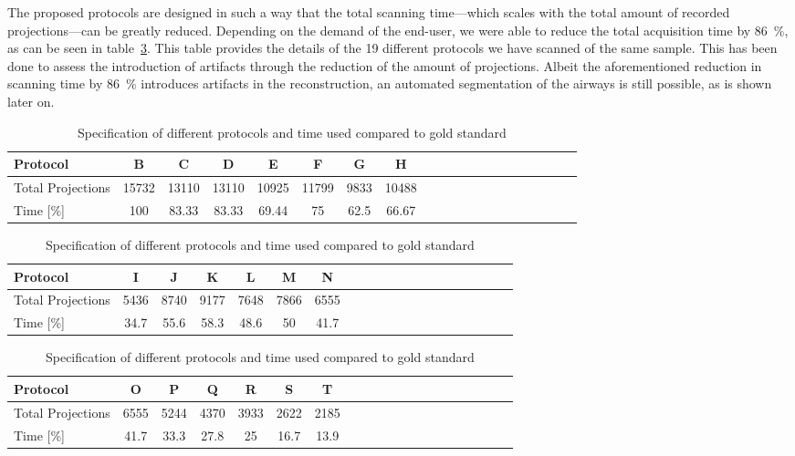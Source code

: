 The proposed protocols are designed in such a way that the total scanning time---which scales with the total amount of recorded projections---can be greatly reduced. Depending on the demand of the end-user, we were able to reduce the total acquisition time by \SI{86}{\percent}, as can be seen in table~\ref{tab:projections}. This table provides the details of the 19 different protocols we have scanned of the same sample. This has been done to assess the introduction of artifacts through the reduction of the amount of projections. Albeit the aforementioned reduction in scanning time by \SI{86}{\percent} introduces artifacts in the reconstruction, an automated segmentation of the airways is still possible, as is shown later on.

\begin{table}
\centering
	\caption{Specification of different protocols and time used compared to gold standard}
	\begin{tabular*}{\textwidth}{l@{\extracolsep\fill}ccccccccccccccccccc}
		\toprule
		Protocol 			& B & C & D & E & F & G & H\\
		\midrule
		Total Projections 	& 15732 & 13110 & 13110 & 10925 & 11799 & 9833 & 10488\\
		Time [\%] 			& 100 & 83.33 & 83.33 & 69.44 & 75 & 62.5 & 66.67\\
		\bottomrule
	\end{tabular*}
	\begin{tabular*}{\textwidth}{l@{\extracolsep\fill}ccccccccccccccccccc}
		\toprule
		Protocol 			& I & J & K & L & M & N \\
		\midrule
		Total Projections 	& 5436 & 8740 & 9177 & 7648 & 7866 & 6555 \\
		Time [\%] 			& 34.7 & 55.6 & 58.3 & 48.6 & 50 & 41.7 \\
 		\bottomrule
	\end{tabular*}
	\begin{tabular*}{\textwidth}{l@{\extracolsep\fill}ccccccccccccccccccc}
		\toprule
		Protocol 			& O & P & Q & R & S & T \\
		\midrule
		Total Projections 	& 6555 & 5244 & 4370 & 3933 & 2622 & 2185 \\
		Time [\%] 			& 41.7 & 33.3 & 27.8 & 25 & 16.7 & 13.9 \\
		\bottomrule
	\end{tabular*}
	\label{tab:projections}
\end{table}

